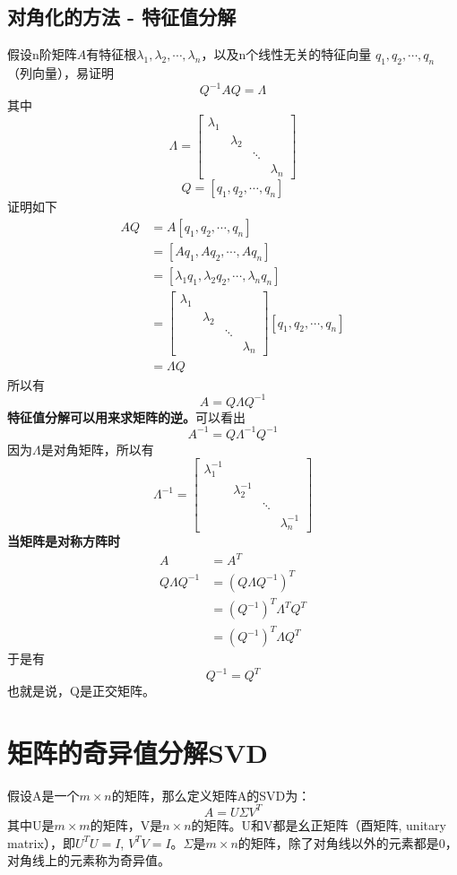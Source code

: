 \documentclass[]{article}
\begin{document}
\subsection{对角化的方法 - 特征值分解}
假设n阶矩阵$ A $有特征根$\lambda_1,  \lambda_2, \cdots, \lambda_n$，以及n个线性无关的特征向量 $ q_1, q_2, \cdots, q_n $（列向量），易证明
\[ 
Q^{-1}AQ = \Lambda
 \]
其中
\[ 
\Lambda =
\begin{bmatrix}
\lambda_1 & & & \\
& \lambda_2 & & \\
& & \ddots & \\
& & & \lambda_n
\end{bmatrix}
 \]
\[ 
Q = [q_1, q_2, \cdots, q_n]
 \]
证明如下
\[ 
\begin{aligned}
AQ &= A[q_1, q_2, \cdots, q_n] \\
   &= [Aq_1, Aq_2, \cdots, Aq_n] \\
   &= [\lambda_1 q_1, \lambda_2 q_2, \cdots, \lambda_n q_n] \\
   &= 
   \begin{bmatrix}
   \lambda_1 & & & \\
   & \lambda_2 & & \\
   & & \ddots & \\
   & & & \lambda_n
   \end{bmatrix}   
   [q_1, q_2, \cdots, q_n] \\
   &= \Lambda Q
\end{aligned}
 \]
所以有
\[ 
A = Q\Lambda Q^{-1}
 \]
\textbf{特征值分解可以用来求矩阵的逆。}可以看出
\[ 
A^{-1} = Q\Lambda^{-1}Q^{-1}
 \]
因为$ \Lambda $是对角矩阵，所以有
\[ 
\Lambda^{-1} =
\begin{bmatrix}
\lambda_1^{-1} & & & \\
& \lambda_2^{-1} & & \\
& & \ddots & \\
& & & \lambda_n^{-1}
\end{bmatrix}
\]
\textbf{当矩阵是对称方阵时}
\[ 
\begin{aligned}
A &= A^T \\
Q\Lambda Q^{-1} &= (Q\Lambda Q^{-1})^T \\
                &= (Q^{-1})^T\Lambda^T Q^T \\
                &= (Q^{-1})^T\Lambda Q^T
\end{aligned}
 \]
于是有
\[ 
Q^{-1} = Q^T
 \]
也就是说，Q是正交矩阵。


\section{矩阵的奇异值分解SVD}
假设A是一个$ m \times n$的矩阵，那么定义矩阵A的SVD为：
\[ 
A = U\Sigma V^T
 \]
其中U是$ m\times m $的矩阵，V是$ n\times n $的矩阵。U和V都是幺正矩阵（酉矩阵, unitary matrix），即$ U^T U = I $, $ V^T V = I $。$ \Sigma $是$ m \times n$的矩阵，除了对角线以外的元素都是0，对角线上的元素称为奇异值。
\end{document}
